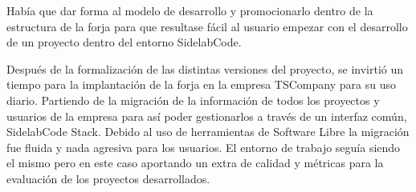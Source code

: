 \par Hab\'ia que dar forma al modelo de desarrollo y promocionarlo dentro de la estructura de la forja para que resultase f\'acil al usuario empezar con el desarrollo de un proyecto dentro del entorno SidelabCode.

\par Despu\'es de la formalizaci\'on de las distintas versiones del proyecto, se invirti\'o un tiempo para la implantaci\'on de la forja en la empresa TSCompany para su uso diario. Partiendo de la migraci\'on de la informaci\'on de todos los proyectos y usuarios de la empresa para as\'i poder gestionarlos a trav\'es de un interfaz com\'un, SidelabCode Stack. Debido al uso de herramientas de Software Libre la migraci\'on fue fluida y nada agresiva para los usuarios. El entorno de trabajo segu\'ia siendo el mismo pero en este caso aportando un extra de calidad y m\'etricas para la evaluaci\'on de los proyectos desarrollados.

